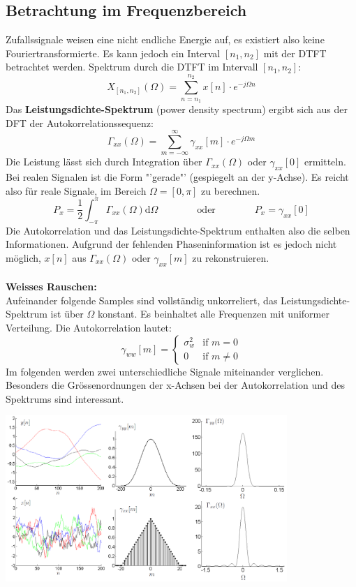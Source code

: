\subsection{Betrachtung im Frequenzbereich}
Zufallssignale weisen eine nicht endliche Energie auf, es existiert also keine Fouriertransformierte.
Es kann jedoch ein Interval $[n_1,n_2]$ mit der DTFT betrachtet werden.
Spektrum durch die DTFT im Intervall $[n_1,n_2]$:
\[ X_{[n_1,n_2]}(\Omega) = \sum_{n=n_1}^{n_2}x[n]\cdot e^{-j\Omega n} \]
Das \textbf{Leistungsdichte-Spektrum} (power density spectrum) ergibt sich aus der 
DFT der Autokorrelationssequenz:
\[ \Gamma_{xx}(\Omega) = \sum_{m=-\infty}^{\infty}\gamma_{xx}[m] \cdot
	e^{-j\Omega m} \]
Die Leistung lässt sich durch Integration über 	$\Gamma_{xx}(\Omega)$ oder $\gamma_{xx}[0]$ ermitteln.
Bei realen Signalen ist die Form "'gerade"' (gespiegelt an der y-Achse). Es reicht also für reale Signale,
im Bereich $\Omega = [0,\pi]$ zu berechnen.
\[ P_x = \frac{1}{2} \int_{-\pi}^{\pi} \Gamma_{xx}(\Omega) \text{d} \Omega \qquad \qquad  \text{oder}
		\qquad \qquad	P_x = \gamma_{xx}[0] \]
Die Autokorrelation und das Leistungsdichte-Spektrum enthalten also die selben Informationen.
Aufgrund der fehlenden Phaseninformation ist es jedoch nicht möglich, $x[n]$ aus $\Gamma_{xx}(\Omega)$
oder $\gamma_{xx}[m]$ zu rekonstruieren.
~\\\\
\textbf{Weisses Rauschen:}\\
Aufeinander folgende Samples sind vollständig unkorreliert, das 
Leistungsdichte-Spektrum ist über $\Omega$ konstant. Es beinhaltet alle Frequenzen mit uniformer
Verteilung. Die Autokorrelation lautet:
\[ \gamma_{ww}[m] = \left\lbrace\begin{matrix}
	\sigma_w^2	& \textrm{if } m = 0\\
	0			& \textrm{if } m \neq 0
\end{matrix}\right. \]
Im folgenden werden zwei unterschiedliche Signale miteinander verglichen. Besonders die 
Grössenordnungen der x-Achsen bei der Autokorrelation und des Spektrums sind interessant. 
\begin{center}
	\includegraphics[width=0.8\textwidth]{../fig/vergleich_zufallssignale}
\end{center}

